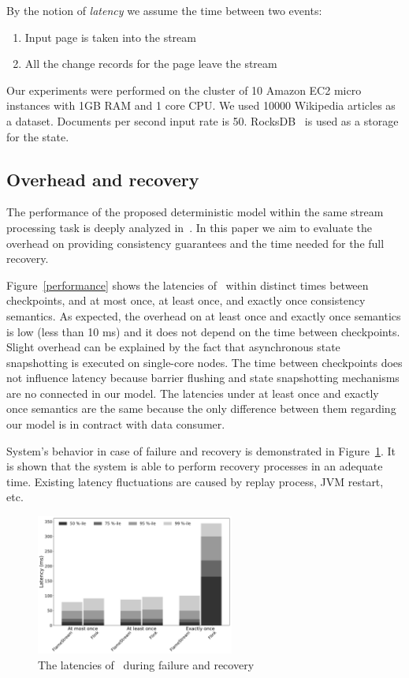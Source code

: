 By the notion of {\it latency} we assume the time between two events: 

\begin{enumerate}
    \item Input page is taken into the stream
    \item All the change records for the page leave the stream
\end{enumerate}

Our experiments were performed on the cluster of 10 Amazon EC2 micro instances with 1GB RAM and 1 core CPU. We used 10000 Wikipedia articles as a dataset. Documents per second input rate is 50. RocksDB~\cite{rocksdb} is used as a storage for the state.

\subsection{Overhead and recovery}
The performance of the proposed deterministic model within the same stream processing task is deeply analyzed in~\cite{we2018seim}. In this paper we aim to evaluate the overhead on providing consistency guarantees and the time needed for the full recovery.

Figure~\ref{performance} shows the latencies of \FlameStream\ within distinct times between checkpoints, and at most once, at least once, and exactly once consistency semantics. As expected, the overhead on at least once and exactly once semantics is low (less than 10 ms) and it does not depend on the time between checkpoints. Slight overhead can be explained by the fact that asynchronous state snapshotting is executed on single-core nodes. The time between checkpoints does not influence latency because barrier flushing and state snapshotting mechanisms are no connected in our model. The latencies under at least once and exactly once semantics are the same because the only difference between them regarding our model is in contract with data consumer.

System's behavior in case of failure and recovery is demonstrated in Figure~\ref{recovery}. It is shown that the system is able to perform recovery processes in an adequate time. Existing latency fluctuations are caused by replay process, JVM restart, etc.

\begin{figure}[htbp]
  \centering
  \includegraphics[width=0.58\textwidth]{pics/comparison}
  \caption{The latencies of \FlameStream\ during failure and recovery}
  \label {recovery}
\end{figure}

